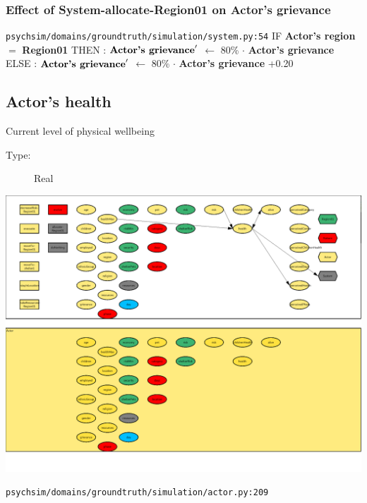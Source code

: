 \documentclass{article}%
\begin{document}
\subsubsection{Effect of System{-}allocate{-}Region01 on Actor's grievance}%
\label{ssubsec:Effect of System{-}allocate{-}Region01 on Actor's grievance}%
\begin{flushleft}%
\verb|psychsim/domains/groundtruth/simulation/system.py:54|%
\linebreak%
IF %
\textbf{Actor's region}%
$=$%
\textbf{Region01}%
\linebreak%
\hspace*{2em}%
THEN %
: %
$\mbox{\textbf{Actor's grievance}} '$%
$\leftarrow$%
80\%%
$\cdot$%
\textbf{Actor's grievance}%
\linebreak%
\hspace*{2em}%
ELSE %
: %
$\mbox{\textbf{Actor's grievance}} '$%
$\leftarrow$%
80\%%
$\cdot$%
\textbf{Actor's grievance}%
+0.20%
\end{flushleft}

%
\subsection{Actor's health}%
\label{subsec:Actor's health}%
Current level of physical wellbeing%
\begin{description}%
\item[Type:]%
Real%
\end{description}%
\includegraphics[width=\textwidth]{images/healthOfActor.png}%
\begin{flushleft}%
\verb|psychsim/domains/groundtruth/simulation/actor.py:209|%
\end{flushleft}%
\end{document}
